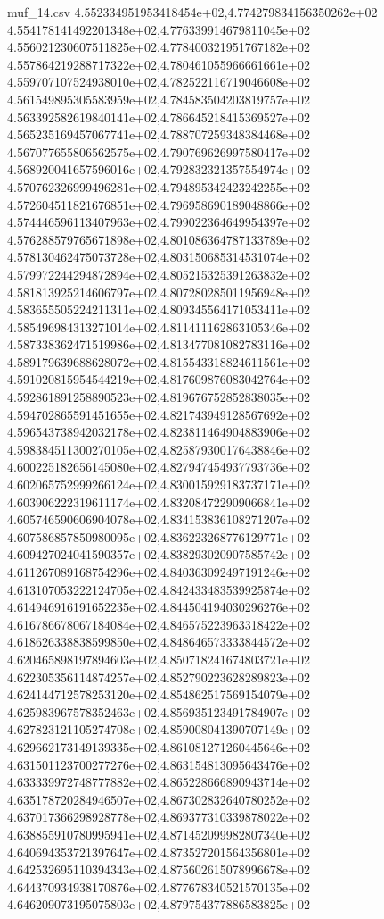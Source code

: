 \begin{filecontents*}{muf_14.csv}
4.552334951953418454e+02,4.774279834156350262e+02
4.554178141492201348e+02,4.776339914679811045e+02
4.556021230607511825e+02,4.778400321951767182e+02
4.557864219288717322e+02,4.780461055966661661e+02
4.559707107524938010e+02,4.782522116719046608e+02
4.561549895305583959e+02,4.784583504203819757e+02
4.563392582619840141e+02,4.786645218415369527e+02
4.565235169457067741e+02,4.788707259348384468e+02
4.567077655806562575e+02,4.790769626997580417e+02
4.568920041657596016e+02,4.792832321357554974e+02
4.570762326999496281e+02,4.794895342423242255e+02
4.572604511821676851e+02,4.796958690189048866e+02
4.574446596113407963e+02,4.799022364649954397e+02
4.576288579765671898e+02,4.801086364787133789e+02
4.578130462475073728e+02,4.803150685314531074e+02
4.579972244294872894e+02,4.805215325391263832e+02
4.581813925214606797e+02,4.807280285011956948e+02
4.583655505224211311e+02,4.809345564171053411e+02
4.585496984313271014e+02,4.811411162863105346e+02
4.587338362471519986e+02,4.813477081082783116e+02
4.589179639688628072e+02,4.815543318824611561e+02
4.591020815954544219e+02,4.817609876083042764e+02
4.592861891258890523e+02,4.819676752852838035e+02
4.594702865591451655e+02,4.821743949128567692e+02
4.596543738942032178e+02,4.823811464904883906e+02
4.598384511300270105e+02,4.825879300176438846e+02
4.600225182656145080e+02,4.827947454937793736e+02
4.602065752999266124e+02,4.830015929183737171e+02
4.603906222319611174e+02,4.832084722909066841e+02
4.605746590606904078e+02,4.834153836108271207e+02
4.607586857850980095e+02,4.836223268776129771e+02
4.609427024041590357e+02,4.838293020907585742e+02
4.611267089168754296e+02,4.840363092497191246e+02
4.613107053222124705e+02,4.842433483539925874e+02
4.614946916191652235e+02,4.844504194030296276e+02
4.616786678067184084e+02,4.846575223963318422e+02
4.618626338838599850e+02,4.848646573333844572e+02
4.620465898197894603e+02,4.850718241674803721e+02
4.622305356114874257e+02,4.852790223628289823e+02
4.624144712578253120e+02,4.854862517569154079e+02
4.625983967578352463e+02,4.856935123491784907e+02
4.627823121105274708e+02,4.859008041390707149e+02
4.629662173149139335e+02,4.861081271260445646e+02
4.631501123700277276e+02,4.863154813095643476e+02
4.633339972748777882e+02,4.865228666890943714e+02
4.635178720284946507e+02,4.867302832640780252e+02
4.637017366298928778e+02,4.869377310339878022e+02
4.638855910780995941e+02,4.871452099982807340e+02
4.640694353721397647e+02,4.873527201564356801e+02
4.642532695110394343e+02,4.875602615078996678e+02
4.644370934938170876e+02,4.877678340521570135e+02
4.646209073195075803e+02,4.879754377886583825e+02

\end{filecontents*}
